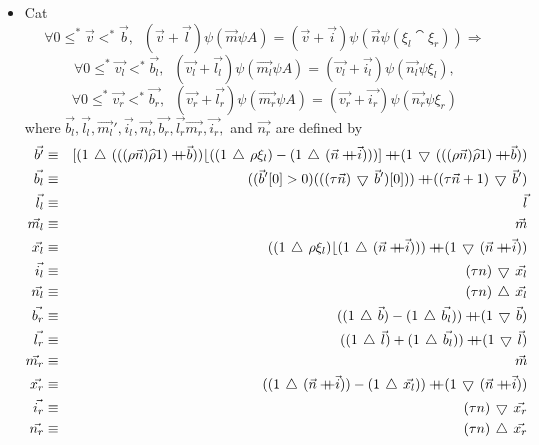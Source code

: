 \begin{itemize}
\item{Cat}
$$\forall 0\leq^{*}\vec{v}<^{*}\vec{b}, \;\;(\vec{v}+\vec{l})\psi(\vec{m}\psi 
	A)=(\vec{v}+\vec{i})\psi(\vec{n}\psi(\xi_{l}\cat\xi_{r}))\Rightarrow$$
$$\forall 0\leq^{*}\vec{v_{l}}<^{*}\vec{b_{l}}, \;\;(\vec{v_{l}}+\vec{l_{l}})
	\psi(\vec{m_{l}}\psi A)=
	(\vec{v_{l}}+\vec{i_{l}})\psi(\vec{n_{l}}\psi \xi_{l}),$$
$$\forall 0\leq^{*}\vec{v_{r}}<^{*}\vec{b_{r}}, \;\;(\vec{v_{r}}+\vec{l_{r}})
	\psi(\vec{m_{r}}\psi A)=
	(\vec{v_{r}}+\vec{i_{r}})\psi(\vec{n_{r}}\psi \xi_{r})$$
where $\vec{b_{l}}, \vec{l_{l}}, \vec{m_{l}}', \vec{i_{l}}, \vec{n_{l}}, 
	\vec{b_{r}}, \vec{l_{r}} \vec{m_{r}}, \vec{i_{r}},$ and 
	$\vec{n_{r}}$ are defined by
\begin{eqnarray*}
\vec{b'} & \equiv & [( 1\take(((\rho\vec{n})\rshp 1)\cat\vec{b}))\lfloor
	(( 1\take\rho\xi_{l})-( 1\take(\vec{n}\cat\vec{i})))]
	\cat( 1\drop(((\rho\vec{n})\rshp 1)\cat\vec{b})) \\
\vec{b_{l}} & \equiv & ((\vec{b}'[0]>0)(((\tau\vec{n})\drop\vec{b}')[0]))\cat
	((\tau\vec{n}+1)\drop\vec{b}') \\
\vec{l_{l}} & \equiv & \vec{l} \\
\vec{m_{l}} & \equiv & \vec{m} \\
\vec{x_{l}} & \equiv & (( 1\take\rho\xi_{l})\lfloor( 1\take
	(\vec{n}\cat\vec{i})))\cat
	( 1\drop(\vec{n}\cat\vec{i})) \\
\vec{i_{l}} & \equiv & (\tau n)\drop\vec{x_{l}} \\
\vec{n_{l}} & \equiv & (\tau n)\take\vec{x_{l}} \\
\vec{b_{r}} & \equiv & (( 1\take\vec{b})-( 1\take\vec{b_{l}}))\cat
	( 1\drop\vec{b}) \\
\vec{l_{r}} & \equiv & (( 1\take\vec{l})+( 1\take\vec{b_{l}}))\cat
	( 1\drop\vec{l}) \\
\vec{m_{r}} & \equiv & \vec{m} \\
\vec{x_{r}} & \equiv & (( 1\take(\vec{n}\cat\vec{i}))-
	( 1\take\vec{x_{l}}))\cat( 1\drop(\vec{n}\cat\vec{i})) \\
\vec{i_{r}} & \equiv & (\tau n)\drop\vec{x_{r}} \\
\vec{n_{r}} & \equiv & (\tau n)\take\vec{x_{r}} \\
\end{eqnarray*}
 

\end{itemize}
